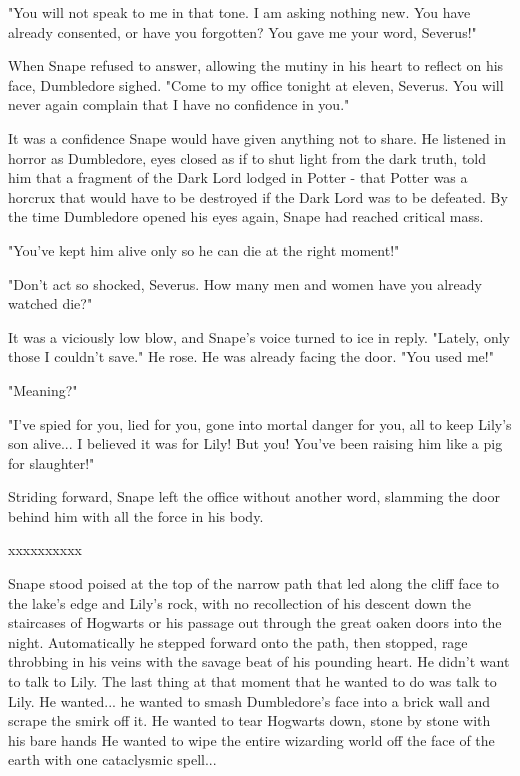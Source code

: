 \documentclass[a4paper,11pt]{article}
\begin{document}
"You will not speak to me in that tone. I am asking nothing new. You have already consented, or have you forgotten? You gave me your word, Severus!"

When Snape refused to answer, allowing the mutiny in his heart to reflect on his face, Dumbledore sighed. "Come to my office tonight at eleven, Severus. You will never again complain that I have no confidence in you."

It was a confidence Snape would have given anything not to share. He listened in horror as Dumbledore, eyes closed as if to shut light from the dark truth, told him that a fragment of the Dark Lord lodged in Potter - that Potter was a horcrux that would have to be destroyed if the Dark Lord was to be defeated. By the time Dumbledore opened his eyes again, Snape had reached critical mass.

"You've kept him alive only so he can die at the right moment!"

"Don't act so shocked, Severus. How many men and women have you already watched die?"

It was a viciously low blow, and Snape's voice turned to ice in reply. "Lately, only those I couldn't save." He rose. He was already facing the door. "You used me!"

"Meaning?"

"I've spied for you, lied for you, gone into mortal danger for you, all to keep Lily's son alive... I believed it was for Lily! But you! You've been raising him like a pig for slaughter!"

Striding forward, Snape left the office without another word, slamming the door behind him with all the force in his body.

xxxxxxxxxx

Snape stood poised at the top of the narrow path that led along the cliff face to the lake's edge and Lily's rock, with no recollection of his descent down the staircases of Hogwarts or his passage out through the great oaken doors into the night. Automatically he stepped forward onto the path, then stopped, rage throbbing in his veins with the savage beat of his pounding heart. He didn't want to talk to Lily. The last thing at that moment that he wanted to do was talk to Lily. He wanted... he wanted to smash Dumbledore's face into a brick wall and scrape the smirk off it. He wanted to tear Hogwarts down, stone by stone with his bare hands He wanted to wipe the entire wizarding world off the face of the earth with one cataclysmic spell...
\end{document}
